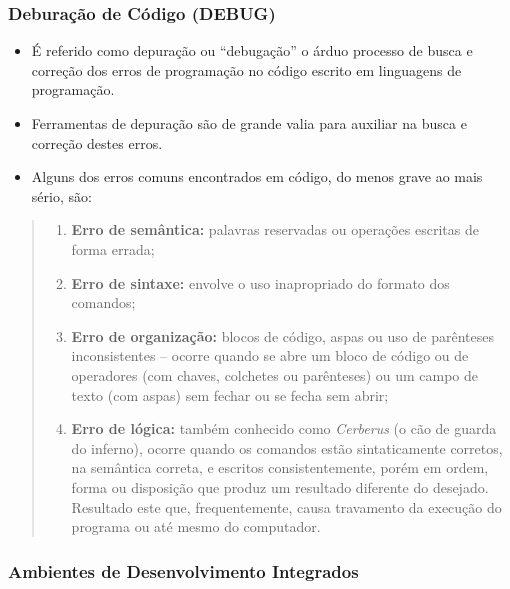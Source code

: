 \documentclass[12pt,a4paper]{article}
\providecommand{\tightlist}{%
      \setlength{\itemsep}{0pt}\setlength{\parskip}{0pt}}
\begin{document}
    \hypertarget{deburauxe7uxe3o-de-cuxf3digo-debug}{%
\subsubsection{Deburação de Código
(DEBUG)}\label{deburauxe7uxe3o-de-cuxf3digo-debug}}

    \begin{itemize}
\item
  É referido como depuração ou ``debugação'' o árduo processo de busca e
  correção dos erros de programação no código escrito em linguagens de
  programação.
\item
  Ferramentas de depuração são de grande valia para auxiliar na busca e
  correção destes erros.
\item
  Alguns dos erros comuns encontrados em código, do menos grave ao mais
  sério, são:
\end{itemize}

    \begin{quote}
\begin{enumerate}
\def\labelenumi{\arabic{enumi}.}
\tightlist
\item
  \textbf{Erro de semântica:} palavras reservadas ou operações escritas
  de forma errada;
\item
  \textbf{Erro de sintaxe:} envolve o uso inapropriado do formato dos
  comandos;
\item
  \textbf{Erro de organização:} blocos de código, aspas ou uso de
  parênteses inconsistentes -- ocorre quando se abre um bloco de código
  ou de operadores (com chaves, colchetes ou parênteses) ou um campo de
  texto (com aspas) sem fechar ou se fecha sem abrir;
\item
  \textbf{Erro de lógica:} também conhecido como \emph{Cerberus} (o cão
  de guarda do inferno), ocorre quando os comandos estão sintaticamente
  corretos, na semântica correta, e escritos consistentemente, porém em
  ordem, forma ou disposição que produz um resultado diferente do
  desejado. Resultado este que, frequentemente, causa travamento da
  execução do programa ou até mesmo do computador.
\end{enumerate}
\end{quote}

    \hypertarget{ambientes-de-desenvolvimento-integrados}{%
\subsubsection{Ambientes de Desenvolvimento
Integrados}\label{ambientes-de-desenvolvimento-integrados}}
\end{document}
